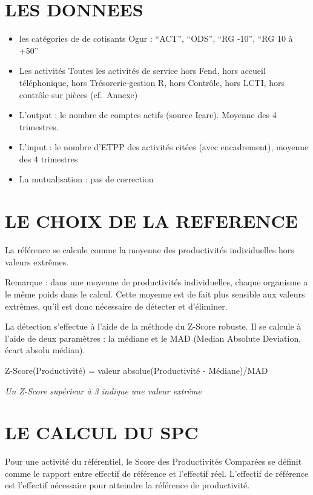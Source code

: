 \documentclass[
]{book}
\begin{document}
\hypertarget{les-donnees-4}{%
\section{LES DONNEES}\label{les-donnees-4}}

\begin{itemize}
\item
  les catégories de de cotisants Ogur : ``ACT'', ``ODS'', ``RG -10'', ``RG 10 à +50''
\item
  Les activités
  Toutes les activités de service hors Fend, hors accueil téléphonique, hors Trésorerie-gestion R, hors Contrôle, hors LCTI, hors contrôle sur pièces (cf.~Annexe)
\item
  L'output : le nombre de comptes actifs (source Icare). Moyenne des 4 trimestres.
\item
  L'input : le nombre d'ETPP des activités citées (avec encadrement), moyenne des 4 trimestres
\item
  La mutualisation : pas de correction
\end{itemize}

\hypertarget{le-choix-de-la-reference-1}{%
\section{LE CHOIX DE LA REFERENCE}\label{le-choix-de-la-reference-1}}

La référence se calcule comme la moyenne des productivités individuelles hors valeurs extrêmes.

Remarque : dans une moyenne de productivités individuelles, chaque organisme a le même poids dans le calcul. Cette moyenne est de fait plus sensible aux valeurs extrêmes, qu'il est donc nécessaire de détecter et d'éliminer.

La détection s'effectue à l'aide de la méthode du Z-Score robuste.
Il se calcule à l'aide de deux paramètres : la médiane et le MAD (Median Absolute Deviation, écart absolu médian).

Z-Score(Productivité) = valeur absolue(Productivité - Médiane)/MAD

\emph{Un Z-Score supérieur à 3 indique une valeur extrême}

\hypertarget{le-calcul-du-spc-1}{%
\section{LE CALCUL DU SPC}\label{le-calcul-du-spc-1}}

Pour une activité du référentiel, le Score des Productivités Comparées se définit comme le rapport entre effectif de référence et l'effectif réel. L'effectif de référence est l'effectif nécessaire pour atteindre la référence de productivité.
\end{document}
